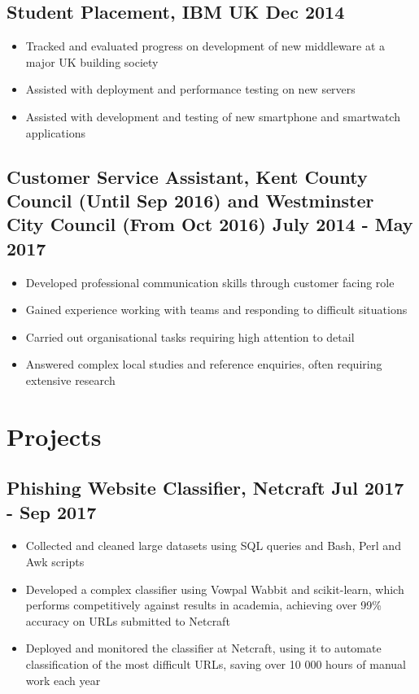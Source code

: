 \documentclass[a4paper, 8pt]{extarticle}
\begin{document}
\begin{minipage}[t]{.66\textwidth}
\subsection*{Student Placement, IBM UK \hfill Dec 2014}
\begin{itemize}
	\item Tracked and evaluated progress on development of new middleware at a major UK building society
	\item Assisted with deployment and performance testing on new servers
	\item Assisted with development and testing of new smartphone and smartwatch applications
\end{itemize}

\subsection*{Customer Service Assistant, Kent County Council (Until Sep 2016) and Westminster City Council (From Oct 2016) \hfill July 2014 - May 2017}
\begin{itemize}
	\item Developed professional communication skills through customer facing role
	\item Gained experience working with teams and responding to difficult situations
	\item Carried out organisational tasks requiring high attention to detail
	\item Answered complex local studies and reference enquiries, often requiring extensive research
\end{itemize}


\section*{Projects}

\subsection*{Phishing Website Classifier, Netcraft \hfill Jul 2017 - Sep 2017}
\begin{itemize}
	\item Collected and cleaned large datasets using SQL queries and Bash, Perl and Awk scripts
	\item Developed a complex classifier using Vowpal Wabbit and scikit-learn, which performs competitively against results in academia, achieving over 99\% accuracy on URLs submitted to Netcraft
	\item Deployed and monitored the classifier at Netcraft, using it to automate classification of the most difficult URLs, saving over 10 000 hours of manual work each year
\end{itemize}


\end{minipage}
\end{document}

